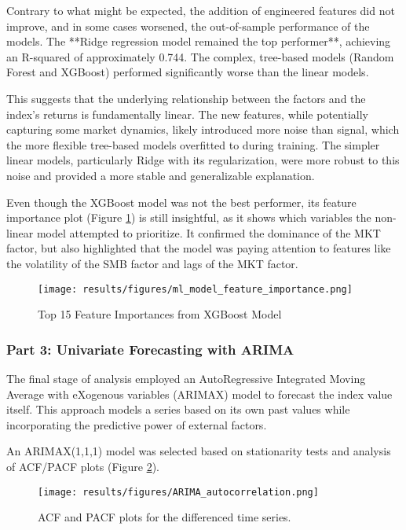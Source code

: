 \documentclass[12pt]{article}
\begin{document}
Contrary to what might be expected, the addition of engineered features did not improve, and in some cases worsened, the out-of-sample performance of the models. The **Ridge regression model remained the top performer**, achieving an R-squared of approximately 0.744. The complex, tree-based models (Random Forest and XGBoost) performed significantly worse than the linear models.

This suggests that the underlying relationship between the factors and the index's returns is fundamentally linear. The new features, while potentially capturing some market dynamics, likely introduced more noise than signal, which the more flexible tree-based models overfitted to during training. The simpler linear models, particularly Ridge with its regularization, were more robust to this noise and provided a more stable and generalizable explanation.

Even though the XGBoost model was not the best performer, its feature importance plot (Figure \ref{fig:feature_importance}) is still insightful, as it shows which variables the non-linear model attempted to prioritize. It confirmed the dominance of the MKT factor, but also highlighted that the model was paying attention to features like the volatility of the SMB factor and lags of the MKT factor.

\begin{figure}[H]
    \centering
    \texttt{[image: results/figures/ml\_model\_feature\_importance.png]}
    \caption{Top 15 Feature Importances from XGBoost Model}
    \label{fig:feature_importance}
\end{figure}

\subsubsection{Part 3: Univariate Forecasting with ARIMA}
The final stage of analysis employed an AutoRegressive Integrated Moving Average with eXogenous variables (ARIMAX) model to forecast the index value itself. This approach models a series based on its own past values while incorporating the predictive power of external factors.

An ARIMAX(1,1,1) model was selected based on stationarity tests and analysis of ACF/PACF plots (Figure \ref{fig:acf_pacf}).

\begin{figure}[H]
    \centering
    \texttt{[image: results/figures/ARIMA\_autocorrelation.png]}
    \caption{ACF and PACF plots for the differenced time series.}
    \label{fig:acf_pacf}
\end{figure}
\end{document}
